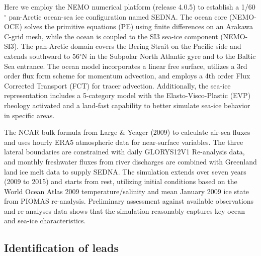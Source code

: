 \documentclass[draft]{agujournal2019}
\begin{document}
Here we employ the NEMO numerical platform (release 4.0.5) to establish a 1/60$^\circ$ pan-Arctic ocean-sea ice configuration named SEDNA. The ocean core (NEMO-OCE) solves the primitive equations (PE) using finite differences on an Arakawa C-grid mesh, while the ocean is coupled to the SI3 sea-ice component (NEMO-SI3). The pan-Arctic domain covers the Bering Strait on the Pacific side and extends southward to 56$^\circ$N in the Subpolar North Atlantic gyre and to the Baltic Sea entrance. The ocean model incorporates a linear free surface, utilizes a 3rd order flux form scheme for momentum advection, and employs a 4th order Flux Corrected Transport (FCT) for tracer advection. Additionally, the sea-ice representation includes a 5-category model with the Elasto-Visco-Plastic (EVP) rheology activated and a land-fast capability to better simulate sea-ice behavior in specific areas.

The NCAR bulk formula from Large \& Yeager (2009) to calculate air-sea fluxes and uses hourly ERA5 atmospheric data for near-surface variables. The three lateral boundaries are constrained with daily GLORYS12V1 Re-analysis data, and monthly freshwater fluxes from river discharges are combined with Greenland land ice melt data to supply SEDNA. The simulation extends over seven years (2009 to 2015) and starts from rest, utilizing initial conditions based on the World Ocean Atlas 2009 temperature/salinity and mean January 2009 ice state from PIOMAS re-analysis. Preliminary assessment against available observations and re-analyses data shows that the simulation reasonably captures key ocean and sea-ice characteristics.


\subsection*{Identification of leads}
\end{document}
